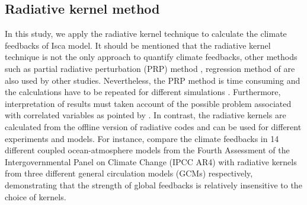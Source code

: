 \subsection{Radiative kernel method}
\label{sec:rad_kernel_method_for_pa}

In this study, we apply the radiative kernel  technique \citep{Soden2008,Shell2008} to calculate the climate feedbacks of Isca model. It should be mentioned that the radiative kernel technique is not the only approach to quantify climate feedbacks, other methods such as partial radiative perturbation (PRP) method \citep{Wetherald1988cloud}, regression method of \cite{Gregory2004} are also used by other studies. Nevertheless, the PRP method is time consuming and the calculations have to be repeated for different simulations \citep{Shell2008}. Furthermore, interpretation of results must taken account of the possible problem associated with correlated variables as pointed by \cite{Bony2006}. In contrast, the radiative kernels are calculated from the offline version of radiative codes and can be used for different experiments and models. For instance, \cite{Soden2008} compare the climate feedbacks in 14 different coupled ocean-atmosphere models from the Fourth Assessment of the Intergovernmental Panel on Climate Change (IPCC AR4) with radiative kernels from three different general circulation models (GCMs) respectively, demonstrating that the strength of global feedbacks is relatively insensitive to the choice of kernels.


